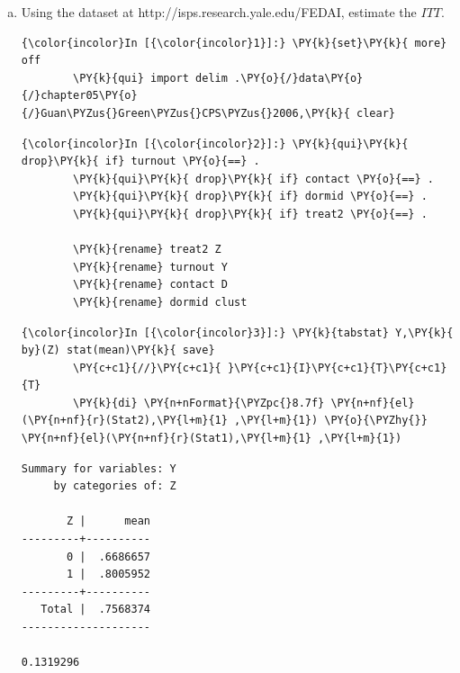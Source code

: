 \documentclass[11pt,notitlepage]{article}\usepackage[]{graphicx}\usepackage[]{color}
\makeatletter
\newenvironment{kframe}{%
 \def\at@end@of@kframe{}%
 \ifinner\ifhmode%
  \def\at@end@of@kframe{\end{minipage}}%
  \begin{minipage}{\columnwidth}%
 \fi\fi%
 \def\FrameCommand##1{\hskip\@totalleftmargin \hskip-\fboxsep
 \colorbox{shadecolor}{##1}\hskip-\fboxsep
     \hskip-\linewidth \hskip-\@totalleftmargin \hskip\columnwidth}%
 \MakeFramed {\advance\hsize-\width
   \@totalleftmargin\z@ \linewidth\hsize
   \@setminipage}}%
 {\par\unskip\endMakeFramed%
 \at@end@of@kframe}
\newenvironment{knitrout}{}{} %
\makeatother
\begin{document}
\begin{enumerate}[a)]
\item Using the dataset at http://isps.research.yale.edu/FEDAI, estimate the $ITT$.
\begin{knitrout}
\color{fgcolor}\begin{kframe}
\begin{Verbatim}[commandchars=\\\{\}]
{\color{incolor}In [{\color{incolor}1}]:} \PY{k}{set}\PY{k}{ more} off
        \PY{k}{qui} import delim .\PY{o}{/}data\PY{o}{/}chapter05\PY{o}{/}Guan\PYZus{}Green\PYZus{}CPS\PYZus{}2006,\PY{k}{ clear}
\end{Verbatim}
    \begin{Verbatim}[commandchars=\\\{\}]
{\color{incolor}In [{\color{incolor}2}]:} \PY{k}{qui}\PY{k}{ drop}\PY{k}{ if} turnout \PY{o}{==} .
        \PY{k}{qui}\PY{k}{ drop}\PY{k}{ if} contact \PY{o}{==} .
        \PY{k}{qui}\PY{k}{ drop}\PY{k}{ if} dormid \PY{o}{==} .
        \PY{k}{qui}\PY{k}{ drop}\PY{k}{ if} treat2 \PY{o}{==} . 
        
        \PY{k}{rename} treat2 Z
        \PY{k}{rename} turnout Y
        \PY{k}{rename} contact D
        \PY{k}{rename} dormid clust
\end{Verbatim}

    \begin{Verbatim}[commandchars=\\\{\}]
{\color{incolor}In [{\color{incolor}3}]:} \PY{k}{tabstat} Y,\PY{k}{ by}(Z) stat(mean)\PY{k}{ save}
        \PY{c+c1}{//}\PY{c+c1}{ }\PY{c+c1}{I}\PY{c+c1}{T}\PY{c+c1}{T}
        \PY{k}{di} \PY{n+nFormat}{\PYZpc{}8.7f} \PY{n+nf}{el}(\PY{n+nf}{r}(Stat2),\PY{l+m}{1} ,\PY{l+m}{1}) \PY{o}{\PYZhy{}} \PY{n+nf}{el}(\PY{n+nf}{r}(Stat1),\PY{l+m}{1} ,\PY{l+m}{1})
\end{Verbatim}

    \begin{Verbatim}[commandchars=\\\{\}]
Summary for variables: Y
     by categories of: Z 

       Z |      mean
---------+----------
       0 |  .6686657
       1 |  .8005952
---------+----------
   Total |  .7568374
--------------------

0.1319296

    \end{Verbatim}

\end{kframe}
\end{knitrout}


\end{enumerate}
\end{document}

